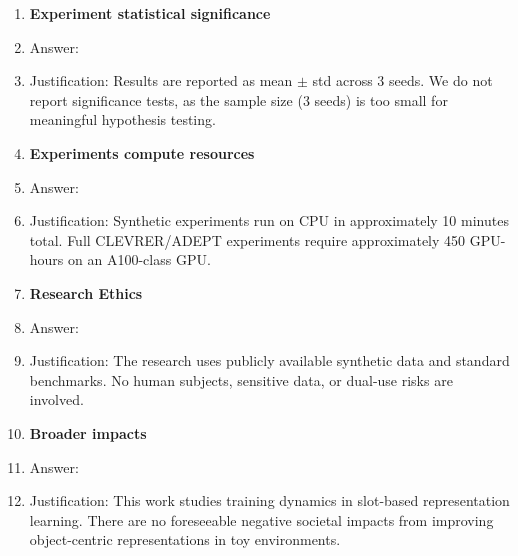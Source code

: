 \documentclass{article}
\begin{document}
\begin{enumerate}
\item {\bf Experiment statistical significance}
    \item[] Answer: \answerYes{}
    \item[] Justification: Results are reported as mean $\pm$ std across 3 seeds.
    We do not report significance tests, as the sample size (3 seeds) is too small
    for meaningful hypothesis testing.

\item {\bf Experiments compute resources}
    \item[] Answer: \answerYes{}
    \item[] Justification: Synthetic experiments run on CPU in approximately 10 minutes
    total. Full CLEVRER/ADEPT experiments require approximately 450 GPU-hours on
    an A100-class GPU.

\item {\bf Research Ethics}
    \item[] Answer: \answerYes{}
    \item[] Justification: The research uses publicly available synthetic data and
    standard benchmarks. No human subjects, sensitive data, or dual-use risks are involved.

\item {\bf Broader impacts}
    \item[] Answer: \answerNA{}
    \item[] Justification: This work studies training dynamics in slot-based
    representation learning. There are no foreseeable negative societal impacts
    from improving object-centric representations in toy environments.

\end{enumerate}
\end{document}
